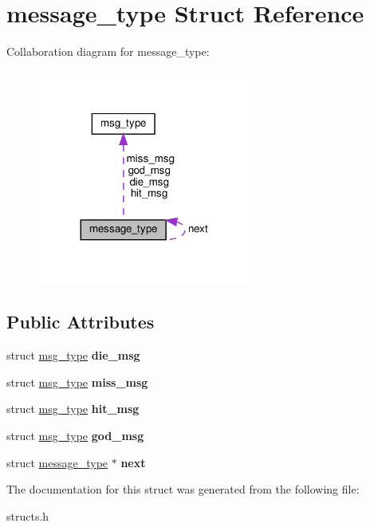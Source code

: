 \hypertarget{structmessage__type}{}\section{message\+\_\+type Struct Reference}
\label{structmessage__type}


Collaboration diagram for message\+\_\+type\+:\nopagebreak
\begin{figure}[H]
\begin{center}
\leavevmode
\includegraphics[width=200pt]{structmessage__type__coll__graph}
\end{center}
\end{figure}
\subsection*{Public Attributes}
\begin{DoxyCompactItemize}
\item 
\mbox{\label{structmessage__type_a80133b1d5675854fbf911df074e17290}} 
struct \hyperlink{structmsg__type}{msg\+\_\+type} {\bfseries die\+\_\+msg}
\item 
\mbox{\label{structmessage__type_ad17635689f46c02c4e09f3c38a06a796}} 
struct \hyperlink{structmsg__type}{msg\+\_\+type} {\bfseries miss\+\_\+msg}
\item 
\mbox{\label{structmessage__type_ad9bb87d7fe2057fd8fffb7cbcdd7f59c}} 
struct \hyperlink{structmsg__type}{msg\+\_\+type} {\bfseries hit\+\_\+msg}
\item 
\mbox{\label{structmessage__type_ac5ad50968cab26b2471918bef0af98e8}} 
struct \hyperlink{structmsg__type}{msg\+\_\+type} {\bfseries god\+\_\+msg}
\item 
\mbox{\label{structmessage__type_ab057ca90031d1883592f0437e9ef0db6}} 
struct \hyperlink{structmessage__type}{message\+\_\+type} $\ast$ {\bfseries next}
\end{DoxyCompactItemize}


The documentation for this struct was generated from the following file\+:\begin{DoxyCompactItemize}
\item 
structs.\+h\end{DoxyCompactItemize}
